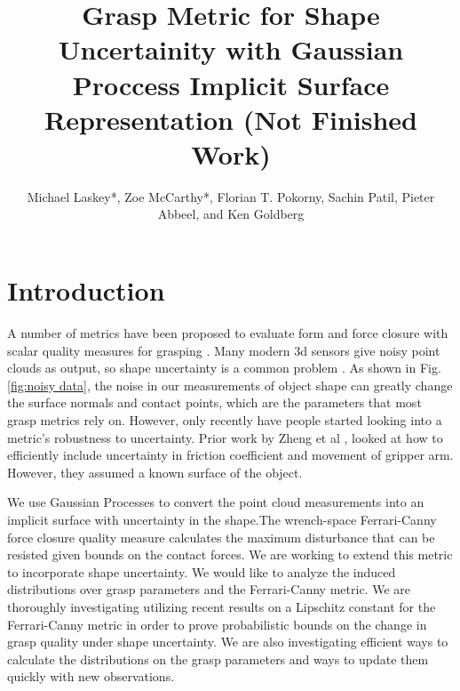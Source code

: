\documentclass[letterpaper, 10 pt, conference]{ieeeconf}  %
\title{\LARGE \bf
Grasp Metric for Shape Uncertainity with Gaussian Proccess Implicit Surface Representation (Not Finished Work) }
\author{Michael Laskey*, Zoe McCarthy*, Florian T. Pokorny, Sachin Patil, Pieter Abbeel, and Ken Goldberg}%
\begin{document}
\maketitle
\thispagestyle{empty}
\pagestyle{empty}





\section{Introduction}

\vspace{10pt}
 A number of metrics have been proposed to evaluate form and force closure with scalar quality measures for grasping \cite{bicchi2000}.  Many modern 3d sensors give noisy point clouds as output, so shape uncertainty is a common problem \cite{singhbigbird}. As shown in Fig. \ref{fig:noisy data}, the noise in our measurements of object shape can greatly change the surface normals and contact points, which are the parameters that most grasp metrics rely on.  However, only recently have people started looking into a metric's robustness to uncertainty. Prior work by Zheng et al \cite{zheng2005}, looked at how to efficiently include uncertainty in friction coefficient and movement of gripper arm. However, they assumed a known surface of the object.
 
We use Gaussian Processes \cite{rasmussen2006} to convert the point cloud measurements into an implicit surface with uncertainty in the shape.The wrench-space Ferrari-Canny force closure quality measure \cite{ferrari1992} calculates the maximum disturbance that can be resisted given bounds on the contact forces.
We are working to extend this metric to incorporate shape uncertainty. We would like to analyze the induced distributions over grasp parameters and the Ferrari-Canny metric. We are thoroughly investigating utilizing recent results on a Lipschitz constant for the Ferrari-Canny metric \cite{pokorny2013classical} in order to prove probabilistic bounds on the change in grasp quality under shape uncertainty. We are also investigating efficient ways to calculate the distributions on the grasp parameters and ways to update them quickly with new observations.
\end{document}
